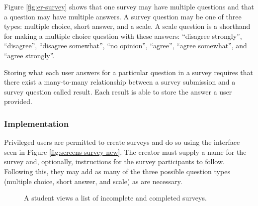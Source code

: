 Figure \ref{fig:er-survey} shows that one survey may have multiple questions and that a question may have multiple answers. A survey question may be one of three types: multiple choice, short answer, and a scale. A scale question is a shorthand for making a multiple choice question with these answers: ``disagree strongly'', ``disagree'', ``disagree somewhat'', ``no opinion'', ``agree'', ``agree somewhat'', and ``agree strongly''.

Storing what each user answers for a particular question in a survey requires that there exist a many-to-many relationship between a survey submission and a survey question called result. Each result is able to store the answer a user provided.

\subsubsection{Implementation}
Privileged users are permitted to create surveys and do so using the interface seen in Figure \ref{fig:screens-survey-new}. The creator must supply a name for the survey and, optionally, instructions for the survey participants to follow. Following this, they may add as many of the three possible question types (multiple choice, short answer, and scale) as are necessary.

\begin{figure}[h!]
	\centering
	\caption{A student views a list of incomplete and completed surveys.}
	\label{fig:screens-survey-list}
\end{figure}

